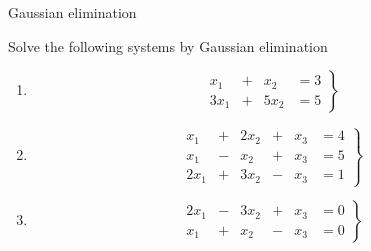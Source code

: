 \documentclass[9pt]{beamer}
\begin{document}
\begin{frame}{Gaussian elimination}

    Solve the following systems by Gaussian elimination
    \begin{enumerate}[leftmargin = 0.5cm, label = (\alph*), rightmargin = 0.2cm]

    \item 
    \begin{equation*}
        \left.
        \begin{alignedat}{4}
             x_1 & {}+{} &  x_2 & = 3 \\
            3x_1 & {}+{} & 5x_2 & = 5
        \end{alignedat}
        \right\}
    \end{equation*}

    \item 
    \begin{equation*}
        \left.
        \begin{alignedat}{4}
             x_1 & {}+{} & 2x_2 & {}+{} &  x_3 & = 4 \\
             x_1 & {}-{} &  x_2 & {}+{} &  x_3 & = 5 \\
            2x_1 & {}+{} & 3x_2 & {}-{} &  x_3 & = 1
        \end{alignedat}
        \right\}
    \end{equation*}

    \item 
    \begin{equation*}
        \left.
        \begin{alignedat}{4}
            2x_1 & {}-{} & 3x_2 & {}+{} &  x_3 & = 0 \\
             x_1 & {}+{} &  x_2 & {}-{} &  x_3 & = 0
        \end{alignedat}
        \right\}
    \end{equation*}
    
    \end{enumerate}
    
\end{frame}
\end{document}
